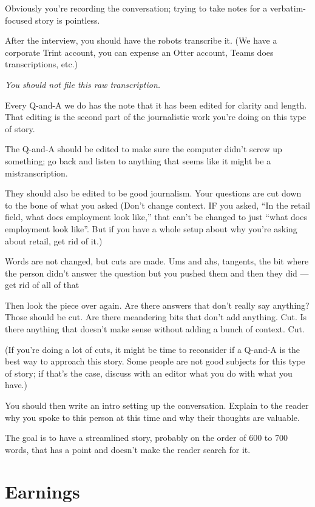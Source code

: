\documentclass[
  12pt,
  american,
  letterpaperpaper,
  extrafontsizes,onecolumn,openright
  ]{memoir}
\begin{document}
Obviously you're recording the conversation; trying to take notes for a verbatim-focused story is pointless.

After the interview, you should have the robots transcribe it. (We have a corporate Trint account, you can expense an Otter account, Teams does transcriptions, etc.)

\emph{You should not file this raw transcription.}

Every Q-and-A we do has the note that it has been edited for clarity and length. That editing is the second part of the journalistic work you're doing on this type of story.

The Q-and-A should be edited to make sure the computer didn't screw up something; go back and listen to anything that seems like it might be a mistranscription.

They should also be edited to be good journalism. Your questions are cut down to the bone of what you asked (Don't change context. IF you asked, \enquote{In the retail field, what does employment look like,} that can't be changed to just \enquote{what does employment look like}. But if you have a whole setup about why you're asking about retail, get rid of it.)

Words are not changed, but cuts are made. Ums and ahs, tangents, the bit where the person didn't answer the question but you pushed them and then they did --- get rid of all of that

Then look the piece over again. Are there answers that don't really say anything? Those should be cut. Are there meandering bits that don't add anything. Cut. Is there anything that doesn't make sense without adding a bunch of context. Cut.

(If you're doing a lot of cuts, it might be time to reconsider if a Q-and-A is the best way to approach this story. Some people are not good subjects for this type of story; if that's the case, discuss with an editor what you do with what you have.)

You should then write an intro setting up the conversation. Explain to the reader why you spoke to this person at this time and why their thoughts are valuable.

The goal is to have a streamlined story, probably on the order of 600 to 700 words, that has a point and doesn't make the reader search for it.

\hypertarget{earnings}{%
\chapter{Earnings}\label{earnings}}
\end{document}
